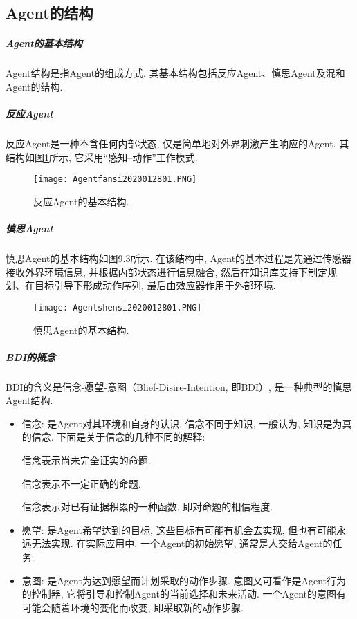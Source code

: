 \subsection{Agent的结构}
\subparagraph{Agent的基本结构}

Agent结构是指Agent的组成方式. 其基本结构包括反应Agent、慎思Agent及混和Agent的结构.
\subparagraph{反应Agent}

    反应Agent是一种不含任何内部状态, 仅是简单地对外界刺激产生响应的Agent. 其结构如图\ref{Agentfansi2020012801}所示, 它采用“感知--动作”工作模式.
\begin{figure}[H]
\centering
  \texttt{[image: Agentfansi2020012801.PNG]}
  \caption{反应Agent的基本结构.}
  \label{Agentfansi2020012801}
\end{figure}

\subparagraph{慎思Agent}

慎思Agent的基本结构如图9.3所示. 在该结构中, Agent的基本过程是先通过传感器接收外界环境信息, 并根据内部状态进行信息融合, 然后在知识库支持下制定规划、在目标引导下形成动作序列, 最后由效应器作用于外部环境.
\begin{figure}[H]
\centering
  \texttt{[image: Agentshensi2020012801.PNG]}
  \caption{慎思Agent的基本结构.}
  \label{Agentshensi2020012801}
\end{figure}
\subparagraph{BDI的概念}
BDI的含义是信念-愿望-意图（Blief-Disire-Intention, 即BDI）, 是一种典型的慎思Agent结构.

\begin{itemize}
\item 信念: 是Agent对其环境和自身的认识. 信念不同于知识, 一般认为, 知识是为真的信念. 下面是关于信念的几种不同的解释:

     信念表示尚未完全证实的命题.

     信念表示不一定正确的命题.

     信念表示对已有证据积累的一种函数, 即对命题的相信程度.

\item 愿望: 是Agent希望达到的目标, 这些目标有可能有机会去实现, 但也有可能永远无法实现. 在实际应用中, 一个Agent的初始愿望, 通常是人交给Agent的任务.
\item 意图: 是Agent为达到愿望而计划采取的动作步骤. 意图又可看作是Agent行为的控制器, 它将引导和控制Agent的当前选择和未来活动. 一个Agent的意图有可能会随着环境的变化而改变, 即采取新的动作步骤.
\end{itemize}
